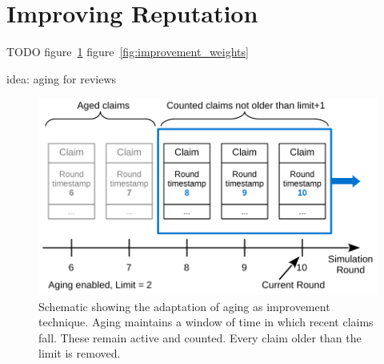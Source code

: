 \documentclass[%
    ]{\PathToTumTemplate/thesis/tum_thesis}
\begin{document}
\section{Improving Reputation}\label{sec:approach_improvements}
TODO
figure~\ref{fig:improvement_aging}
figure~\ref{fig:improvement_weights}

idea: aging for reviews

\begin{figure}[tbp]
  \begin{center}
        \includegraphics[width=1\linewidth]	{../images/improvement_aging-crop.pdf}
    \caption{
    Schematic showing the adaptation of aging as improvement technique.
    Aging maintains a window of time in which recent claims fall.
    These remain active and counted.
    Every claim older than the limit is removed.
    }
    \label{fig:improvement_aging}
  \end{center}
\end{figure}
\end{document}
